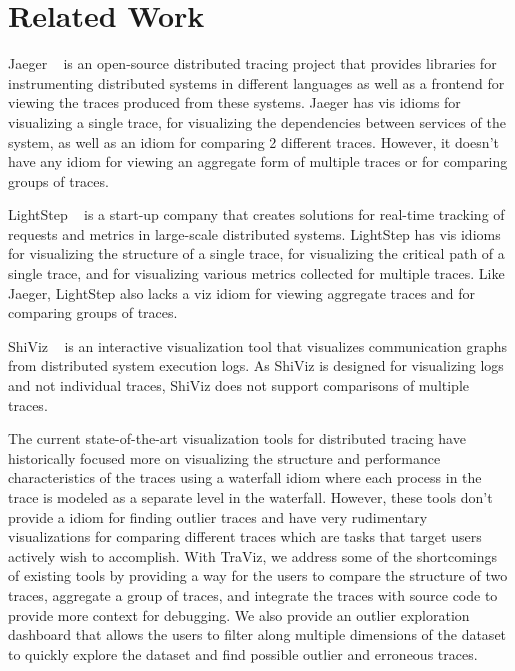 \section{Related Work}

Jaeger ~\cite{Jaeger} is an open-source distributed tracing project
that provides libraries for instrumenting distributed systems
in different languages as well as a frontend for viewing the traces
produced from these systems. Jaeger has vis idioms for visualizing
a single trace, for visualizing the dependencies between services
of the system, as well as an idiom for comparing 2 different traces.
However, it doesn't have any idiom for viewing an aggregate form of
multiple traces or for comparing groups of traces.

LightStep ~\cite{LightStep} is a start-up company that
creates solutions for real-time tracking of requests and metrics
in large-scale distributed systems. LightStep has vis idioms
for visualizing the structure of a single trace, for visualizing
the critical path of a single trace, and 
for visualizing various metrics collected for multiple traces.
Like Jaeger, LightStep also lacks a viz idiom for viewing aggregate
traces and for comparing groups of traces.

ShiViz ~\cite{ShiViz} is an interactive visualization tool
that visualizes communication graphs from distributed system execution
logs. As ShiViz is designed for visualizing logs and not individual traces,
ShiViz does not support comparisons of multiple traces.

The current state-of-the-art visualization tools for distributed tracing
have historically focused more on visualizing the structure and performance
characteristics of the traces using a waterfall idiom where
each process in the trace is modeled as a separate level in the waterfall.
However, these tools don't provide a idiom for finding
outlier traces and have very rudimentary visualizations for comparing
different traces which are tasks that target users actively wish to accomplish.
With TraViz, we address some of the shortcomings of existing tools
by providing a way for the users to compare the structure of two traces,
aggregate a group of traces, and integrate the traces with source code to provide more context
for debugging. We also provide an outlier exploration dashboard that allows
the users to filter along multiple dimensions of the dataset to quickly explore
the dataset and find possible outlier and erroneous traces.
